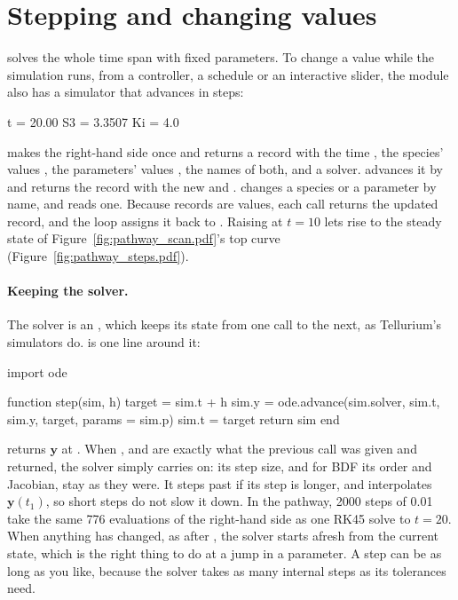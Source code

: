 \documentclass[11pt,a4paper,openany]{report}
\begin{document}
{{\section{Stepping and changing values}

 solves the whole time span with fixed parameters. To change
a value while the simulation runs, from a controller, a schedule or an
interactive slider, the module also has a simulator that advances in steps:

\begin{axonout}
t = 20.00 S3 = 3.3507 Ki = 4.0
\end{axonout}

 makes the right-hand side once and returns a
record with the time , the species' values , the parameters'
values , the names of both, and a solver. 
advances it by  and returns the record with the new  and
.  changes a species or a
parameter by name, and  reads one. Because
records are values, each call returns the updated record, and the loop
assigns it back to . Raising  at $t = 10$ lets 
rise to the steady state of Figure~\ref{fig:pathway_scan.pdf}'s top curve
(Figure~\ref{fig:pathway_steps.pdf}).


\paragraph{Keeping the solver.} The solver is an ,
which keeps its state from one call to the next, as Tellurium's simulators
do.  is one line around it:

\begin{axon}
import ode

function step(sim, h)
  target = sim.t + h
  sim.y = ode.advance(sim.solver, sim.t, sim.y, target, params = sim.p)
  sim.t = target
  return sim
end
\end{axon}

 returns $\mathbf{y}$ at . When
,  and  are exactly what the previous call was given
and returned, the solver simply carries on: its step size, and for BDF its
order and Jacobian, stay as they were. It steps past  if its step
is longer, and interpolates $\mathbf{y}(t_1)$, so short steps do not slow it down.
In the pathway, 2000 steps of 0.01 take the same 776 evaluations of the
right-hand side as one RK45 solve to $t = 20$. When anything has changed, as
after , the solver starts afresh from the current state, which is
the right thing to do at a jump in a parameter. A step can be as long as you
like, because the solver takes as many internal steps as its tolerances
need.

}}
\end{document}
